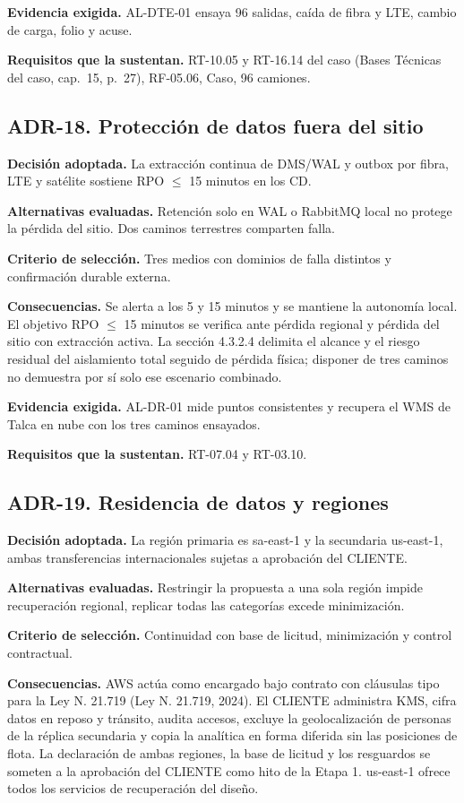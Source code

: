 \textbf{Evidencia exigida.} AL-DTE-01 ensaya 96 salidas, caída de fibra y LTE, cambio de carga, folio y acuse.

\textbf{Requisitos que la sustentan.} RT-10.05 y RT-16.14 del caso (Bases Técnicas del caso, cap.~15, p.~27), RF-05.06, Caso, 96 camiones.

\subsection*{ADR-18. Protección de datos fuera del sitio}
\label{sub:adr-18}
\textbf{Decisión adoptada.} La extracción continua de DMS/WAL y outbox por fibra, LTE y satélite sostiene RPO $\leq$ 15 minutos en los CD.

\textbf{Alternativas evaluadas.} Retención solo en WAL o RabbitMQ local no protege la pérdida del sitio. Dos caminos terrestres comparten falla.

\textbf{Criterio de selección.} Tres medios con dominios de falla distintos y confirmación durable externa.

\textbf{Consecuencias.} Se alerta a los 5 y 15 minutos y se mantiene la autonomía local. El objetivo RPO $\leq$ 15 minutos se verifica ante pérdida regional y pérdida del sitio con extracción activa. La sección 4.3.2.4 delimita el alcance y el riesgo residual del aislamiento total seguido de pérdida física; disponer de tres caminos no demuestra por sí solo ese escenario combinado.

\textbf{Evidencia exigida.} AL-DR-01 mide puntos consistentes y recupera el WMS de Talca en nube con los tres caminos ensayados.

\textbf{Requisitos que la sustentan.} RT-07.04 y RT-03.10.

\subsection*{ADR-19. Residencia de datos y regiones}
\label{sub:adr-19}
\textbf{Decisión adoptada.} La región primaria es sa-east-1 y la secundaria us-east-1, ambas transferencias internacionales sujetas a aprobación del CLIENTE.

\textbf{Alternativas evaluadas.} Restringir la propuesta a una sola región impide recuperación regional, replicar todas las categorías excede minimización.

\textbf{Criterio de selección.} Continuidad con base de licitud, minimización y control contractual.

\textbf{Consecuencias.} AWS actúa como encargado bajo contrato con cláusulas tipo para la Ley N.\textdegree{} 21.719 (Ley N.\textdegree{} 21.719, 2024). El CLIENTE administra KMS, cifra datos en reposo y tránsito, audita accesos, excluye la geolocalización de personas de la réplica secundaria y copia la analítica en forma diferida sin las posiciones de flota. La declaración de ambas regiones, la base de licitud y los resguardos se someten a la aprobación del CLIENTE como hito de la Etapa 1. us-east-1 ofrece todos los servicios de recuperación del diseño.

